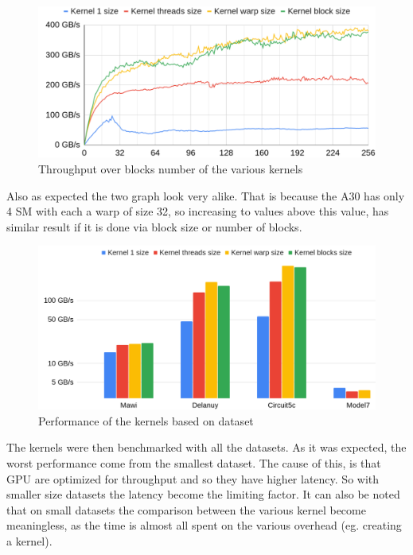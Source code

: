 \documentclass[conference]{IEEEtran}
\begin{document}
\begin{figure}[hbt!]
	\centering
	\includegraphics[width=1\linewidth]{data_images/Gb_for_size_grid}
	\caption{Throughput over blocks number of the various kernels}
	\label{fig:gbforsizegrid}
\end{figure}

Also as expected the two graph look very alike. That is because the A30 has only 4 SM with each a warp of size 32, so increasing to values above this value, has similar result if it is done via block size or number of blocks.


\begin{figure}
	\centering
	\includegraphics[width=0.9\linewidth]{data_images/perf_gpu}
	\caption{Performance of the kernels based on dataset}
	\label{fig:perf-gpu}
\end{figure}
\FloatBarrier
The kernels were then benchmarked with all the datasets. As it was expected, the worst performance come from the smallest dataset. The cause of this, is that GPU are optimized for throughput and so they have higher latency. So with smaller size datasets the latency become the limiting factor. It can also be noted that on small datasets the comparison between the various kernel become meaningless, as the time is almost all spent on the various overhead (eg. creating a kernel).
\end{document}
